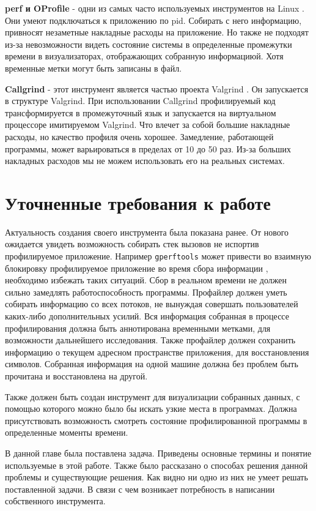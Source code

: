     \textbf{perf и OProfile} - одни из самых часто используемых инструментов на Linux \cite{ibm}. Они умеют подключаться к приложению по pid. Собирать с него информацию, привносят незаметные накладные расходы на приложение. Но также не подходят из-за невозможности видеть состояние системы в определенные промежутки времени в визуализаторах, отображающих собранную информациюй. Хотя временные метки могут быть записаны в файл.
    
    \textbf{Callgrind} - этот инструмент является частью проекта Valgrind \cite{valgrind}. Он запускается в структуре Valgrind. При использовании Callgrind профилируемый код трансформируется в промежуточный язык и запускается на виртуальном процессоре имитируемом Valgrind. Что влечет за собой большие накладные расходы, но качество профиля очень хорошее. Замедление, работающей программы, может варьироваться в пределах от 10 до 50 раз. Из-за больших накладных расходов мы не можем использовать его на реальных системах.
    
\section{Уточненные требования к работе}
	Актуальность создания своего инструмента была показана ранее. От нового ожидается увидеть возможность собирать стек вызовов не испортив профилируемое приложение. Например \verb|gperftools| может привести во взаимную блокировку профилируемое приложение во время сбора информации \cite{deadlock_gperf}, необходимо избежать таких ситуаций. Сбор в реальном времени не должен сильно замедлять работоспособность программы. Профайлер должен уметь собирать информацию со всех потоков, не вынуждая совершать пользователей каких-либо дополнительных усилий. Вся информация собранная в процессе профилирования должна быть аннотирована временными метками, для возможности дальнейшего исследования. Также профайлер должен сохранить информацию о текущем адресном пространстве приложения, для восстановления символов. Собранная информация на одной машине должна без проблем быть прочитана и восстановлена на другой. 
    
    Также должен  быть создан инструмент для визуализации собранных данных, с помощью которого можно было бы искать узкие места в программах. Должна присутствовать возможность смотреть состояние профилированной программы в определенные моменты времени.

\chapterconclusion
	В данной главе была поставлена задача. Приведены основные термины и понятие используемые в этой работе. Также было рассказано о способах решения данной проблемы и существующие решения. Как видно ни одно из них не умеет решать поставленной задачи. В связи с чем возникает потребность в написании собственного инструмента.
    
